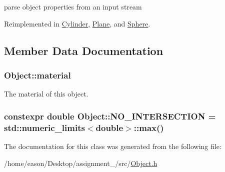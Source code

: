 parse object properties from an input stream 



Reimplemented in \hyperlink{classCylinder_a15050a6257a624cae1566a949b03b7da}{Cylinder}, \hyperlink{classPlane_af5361222d1aa404fc720d7b4b68a634c}{Plane}, and \hyperlink{classSphere_aa55e3407f148feb451866bc39907f6fb}{Sphere}.



\subsection{Member Data Documentation}
\subsubsection[{\texorpdfstring{material}{material}}]{ Object\+::material}\hypertarget{structObject_a2f63d05a9a9264e1b6c388fa4bba4e91}{}\label{structObject_a2f63d05a9a9264e1b6c388fa4bba4e91}


The material of this object. 

\subsubsection[{\texorpdfstring{N\+O\+\_\+\+I\+N\+T\+E\+R\+S\+E\+C\+T\+I\+ON}{NO_INTERSECTION}}]{\setlength{\rightskip}{0pt plus 5cm}constexpr double Object\+::\+N\+O\+\_\+\+I\+N\+T\+E\+R\+S\+E\+C\+T\+I\+ON = std\+::numeric\+\_\+limits$<$double$>$\+::{\bf max}()\hspace{0.3cm}{\ttfamily [static]}}\hypertarget{structObject_a68971b3c931312e76077de7f8597a6d4}{}\label{structObject_a68971b3c931312e76077de7f8597a6d4}


The documentation for this class was generated from the following file\+:\begin{DoxyCompactItemize}
\item 
/home/eason/\+Desktop/assignment\+\_/src/\hyperlink{Object_8h}{Object.\+h}\end{DoxyCompactItemize}

